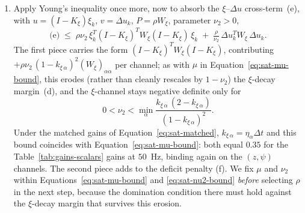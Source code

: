 \documentclass[conf]{new-aiaa}
\begin{document}
\begin{enumerate}
\item Apply Young’s inequality once more, now to absorb the $\xi$–$\Delta u$ cross-term~(e), with $u = (I-K_\xi)\xi_k$, $v = \Delta u_k$, $P = \rho W_\xi$, parameter $\nu_2 > 0$,
\small
\begin{equation}
\text{(e)} \;\leq\; \rho \nu_2\, \xi_k^T (I-K_\xi)^T W_\xi (I-K_\xi)\, \xi_k
\;+\; \tfrac{\rho}{\nu_2}\, \Delta u_k^T W_\xi\, \Delta u_k.
\end{equation}
\normalsize
The first piece carries the form $(I-K_\xi)^T W_\xi (I-K_\xi)$, contributing $+\rho\nu_2\,(1-k_{\xi\,\alpha})^2 (W_\xi)_{\alpha\alpha}$ per channel; as with $\mu$ in Equation~\ref{eq:sat-mu-bound}, this erodes (rather than cleanly rescales by $1-\nu_2$) the $\xi$-decay margin~(d), and the $\xi$-channel stays negative definite only for
\begin{equation}
\label{eq:sat-nu2-bound}
0 < \nu_2 < \min_\alpha \frac{k_{\xi\,\alpha}\,(2 - k_{\xi\,\alpha})}{(1-k_{\xi\,\alpha})^2}.
\end{equation}
Under the matched gains of Equation~\ref{eq:sat-matched}, $k_{\xi\,\alpha} = \eta_\alpha \Delta t$ and this bound coincides with Equation~\ref{eq:sat-mu-bound}: both equal $0.35$ for the Table~\ref{tab:gains-scalars} gains at $50$~Hz, binding again on the $(z, \psi)$ channels. The second piece adds to the deficit penalty (f). We fix $\mu$ and $\nu_2$ within Equations~\ref{eq:sat-mu-bound} and \ref{eq:sat-nu2-bound} \emph{before} selecting $\rho$ in the next step, because the domination condition there must hold against the $\xi$-decay margin that survives this erosion.


\end{enumerate}
\end{document}
